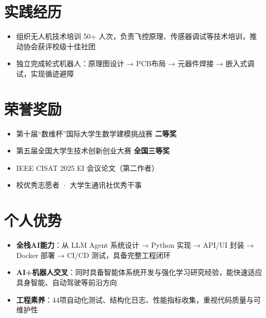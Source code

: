 \documentclass{resume}
\begin{document}
\section{实践经历}
\begin{itemize}
  \item 组织无人机技术培训 50+ 人次，负责飞控原理、传感器调试等技术培训，推动协会获评校级十佳社团
  \item 独立完成轮式机器人：原理图设计 → PCB布局 → 元器件焊接 → 嵌入式调试，实现循迹避障
\end{itemize}

\section{荣誉奖励}
\begin{itemize}
  \item 第十届“数维杯”国际大学生数学建模挑战赛 \textbf{二等奖}
  \item 第五届全国大学生技术创新创业大赛 \textbf{全国三等奖}
  \item IEEE CISAT 2025 EI 会议论文（第二作者）
  \item 校优秀志愿者 · 大学生通讯社优秀干事
\end{itemize}

\section{个人优势}
\begin{itemize}
  \item \textbf{全栈AI能力}：从 LLM Agent 系统设计 → Python 实现 → API/UI 封装 → Docker 部署 → CI/CD 测试，具备完整工程闭环
  \item \textbf{AI+机器人交叉}：同时具备智能体系统开发与强化学习研究经验，能快速适应具身智能、自动驾驶等前沿方向
  \item \textbf{工程素养}：44项自动化测试、结构化日志、性能指标收集，重视代码质量与可维护性
\end{itemize}
\end{document}
